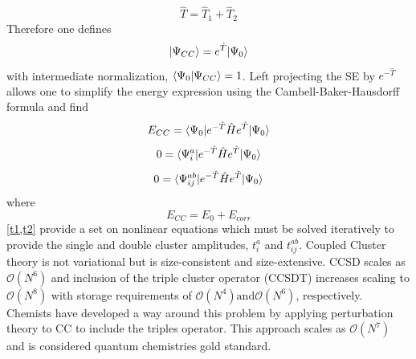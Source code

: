         \begin{equation}
          \hat{T} = \hat{T}_1 + \hat{T}_2
        \end{equation}
      Therefore one defines
        \begin{equation}\label{CC_wfn}
          | \Psi_{CC} \rangle = e^{\hat{T}}| \Psi_0 \rangle
        \end{equation}
      with intermediate normalization, $\langle\Psi_0|\Psi_{CC}\rangle = 1$. 
      Left projecting the SE by $e^{-\hat{T}}$ allows one to simplify the energy expression using the Cambell-Baker-Hausdorff formula\cite{crawford2000} and find%
        \begin{equation}\label{E_cc}
            E_{CC} = \langle\Psi_0 |e^{-\hat{T}} \hat{H} e^{\hat{T}} | \Psi_0 \rangle
        \end{equation}
        \begin{equation}\label{t1}
          0 = \langle\Psi^a_i | e^{-\hat{T}} \hat{H} e^{\hat{T}} | \Psi_0 \rangle
        \end{equation}
        \begin{equation}\label{t2}
          0 = \langle\Psi^{ab}_{ij} | e^{-\hat{T}} \hat{H} e^{\hat{T}} | \Psi_0 \rangle
        \end{equation}
      where 
        \begin{equation}
          E_{CC} = E_0 + E_{corr}
        \end{equation}
      \cref{t1,t2} provide a set on nonlinear equations which must be solved iteratively to provide the single and double cluster amplitudes, $t^a_i$ and $t^{ab}_{ij}$.
      Coupled Cluster theory is not variational but is size-consistent and size-extensive.  
      CCSD scales as $\mathcal{O}(N^6)$ and inclusion of the triple cluster operator (CCSDT) increases scaling to $\mathcal{O}(N^8)$\cite{Noga 1987, Scuseria 1988} with storage requirements of $\mathcal{O}(N^4) \text {and} \mathcal{O}(N^6)$, respectively. Chemists have developed a way around this problem by applying perturbation theory to CC to include the triples operator\cite{Crawford2000}. 
      This approach scales as $\mathcal{O}(N^7)$ and is considered quantum chemistries gold standard.
